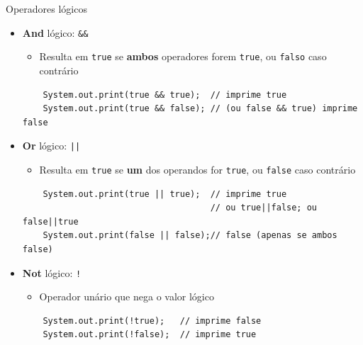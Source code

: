 \documentclass[portuguese, aspectratio=169, xcolor=table]{beamer}
\begin{document}
\begin{frame}[fragile]{Operadores lógicos}
\begin{itemize}
    \item \textbf{And} lógico: \texttt{&&}
    \begin{itemize}
        \item Resulta em \texttt{true} se \textbf{ambos} operadores forem \texttt{true}, ou \texttt{falso} caso contrário
    \end{itemize}
    \begin{verbatim}
    System.out.print(true && true);  // imprime true
    System.out.print(true && false); // (ou false && true) imprime false
    \end{verbatim}
    \item \textbf{Or} lógico: \texttt{||}
    \begin{itemize}
        \item Resulta em \texttt{true} se \textbf{um} dos operandos for \texttt{true}, ou \texttt{false} caso contrário
    \end{itemize}
    \begin{verbatim}
    System.out.print(true || true);  // imprime true
                                     // ou true||false; ou false||true 
    System.out.print(false || false);// false (apenas se ambos false)
    \end{verbatim}
    \item \textbf{Not} lógico: \texttt{!}
    \begin{itemize}
        \item Operador unário que nega o valor lógico
    \end{itemize}
    \begin{verbatim}
    System.out.print(!true);   // imprime false
    System.out.print(!false);  // imprime true
    \end{verbatim}
    \end{itemize}
\end{frame}
\end{document}
